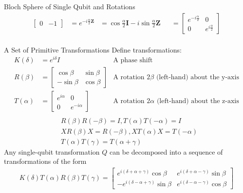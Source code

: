 \documentclass{beamer}
\begin{document}
\begin{frame}{Bloch Sphere of Single Qubit and Rotations}
{\begin{align*}
\begin{bmatrix}
                                                                       0 & -1
                                                                     \end{bmatrix}
                  &= e^{-i\frac{\alpha}2\mathbf{Z}}
                  &= \cos\frac{\alpha}2\mathbf{I} - i\sin\frac{\alpha}2 \mathbf{Z}
                  &&=\begin{bmatrix}
                    e^{-i\frac{\alpha}2} & 0 \\
                    0 & e^{i\frac{\alpha}2}
                    \end{bmatrix} \\
    \end{align*}
  }%
\end{frame}

\begin{frame}{A Set of Primitive Transformations}
  {\tiny
    Define transformations:
    \begin{align*}
      K(\delta) &= e^{i\delta}I & \mbox{A phase shift} \\
      R(\beta)  &= \begin{bmatrix} \cos\beta & \sin\beta \\ -\sin\beta & \cos\beta \end{bmatrix}  & \mbox{A rotation $2\beta$ (left-hand) about the y-axis} \\
      T(\alpha) &= \begin{bmatrix} e^{i\alpha} & 0 \\ 0 & e^{-i\alpha} \end{bmatrix} & \mbox{A rotation $2\alpha$ (left-hand) about the z-axis} \\
    \end{align*}
    \begin{align*}
      &R(\beta)R(-\beta) = I, T(\alpha)T(-\alpha) = I \\
      &XR(\beta)X = R(-\beta), XT(\alpha)X = T(-\alpha) \\
      &T(\alpha)T(\gamma) = T(\alpha + \gamma)
    \end{align*}
    Any single-qubit transformation $Q$ can be decomposed into a sequence of transformations of the form
    \begin{align*}
      K(\delta)T(\alpha)R(\beta)T(\gamma) =
       \begin{bmatrix}
          e^{i(\delta + \alpha + \gamma)} \cos\beta & e^{i(\delta + \alpha - \gamma)} \sin\beta \\
         -e^{i(\delta - \alpha + \gamma)} \sin\beta & e^{i(\delta - \alpha - \gamma)} \cos\beta

\end{bmatrix}
\end{align*}}
\end{frame}
\end{document}
